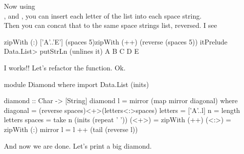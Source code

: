 \askN Now using\\ , and \il{(:)}, you can insert each letter of the list into each space string.\\
Then you can concat that to the same space strings list, reversed.
\answer I see 
\begin{term}
zipWith (:) ['A'..'E'] (spaces 5)\rk
["A","B ","C  ","D   ","E    "]
zipWith (++) (reverse (spaces 5)) it\rk
["    A","   B ","  C  "," D   ","E    "]
Prelude Data.List> putStrLn (unlines it)\rk
    A
   B
  C
 D
E
\end{term}
I works!!
\askN Let's refactor the  function. 
\answer Ok. 
\begin{haskell}[frame=single]
module Diamond
where
import Data.List (inits)

diamond :: Char -> [String]
diamond l = mirror (map mirror diagonal)
    where 
    diagonal = (reverse spaces)<+>(letters<:>spaces)
    letters  = ['A'..l]
    n        = length letters
    spaces   = take n (inits (repeat ' '))
    (<+>)    = zipWith (++)
    (<:>)    = zipWith (:)
    mirror l = l ++ (tail (reverse l))
\end{haskell}
\newpage
\askN And now we are done.
\answer Let's print a big diamond. 
